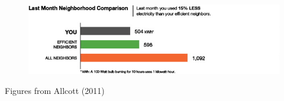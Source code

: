 \documentclass[aspectratio=169]{beamer}
\def\vf{\vfill}
\begin{document}
\begin{frame}

\begin{figure}
  \centering
  \includegraphics[width = \textwidth]{figures/energy_peers_no_emoticon}
\end{figure}

\vf
\tiny{Figures from Allcott (2011)}

\end{frame}
\begin{frame}

\begin{figure}
  \centering
\end{figure}

\end{frame}
\end{document}
